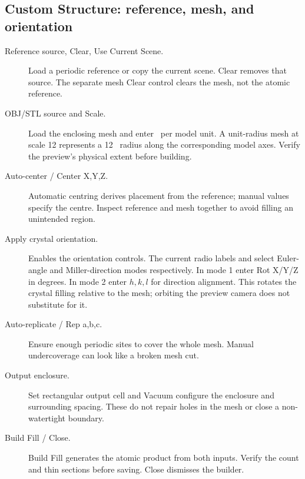 \subsection{Custom Structure: reference, mesh, and orientation}
\begin{description}
\item[Reference source, Clear, Use Current Scene.] Load a periodic reference or copy the current scene. Clear removes that source. The separate mesh Clear control clears the mesh, not the atomic reference.
\item[OBJ/STL source and Scale.] Load the enclosing mesh and enter \angstrom\ per model unit. A unit-radius mesh at scale 12 represents a 12 \angstrom\ radius along the corresponding model axes. Verify the preview's physical extent before building.
\item[Auto-center / Center X,Y,Z.] Automatic centring derives placement from the reference; manual values specify the centre. Inspect reference and mesh together to avoid filling an unintended region.
\item[Apply crystal orientation.] Enables the orientation controls. The current radio labels  and  select Euler-angle and Miller-direction modes respectively. In mode 1 enter Rot X/Y/Z in degrees. In mode 2 enter $h,k,l$ for direction alignment. This rotates the crystal filling relative to the mesh; orbiting the preview camera does not substitute for it.
\item[Auto-replicate / Rep a,b,c.] Ensure enough periodic sites to cover the whole mesh. Manual undercoverage can look like a broken mesh cut.
\item[Output enclosure.] Set rectangular output cell and Vacuum configure the enclosure and surrounding spacing. These do not repair holes in the mesh or close a non-watertight boundary.
\item[Build Fill / Close.] Build Fill generates the atomic product from both inputs. Verify the count and thin sections before saving. Close dismisses the builder.
\end{description}

